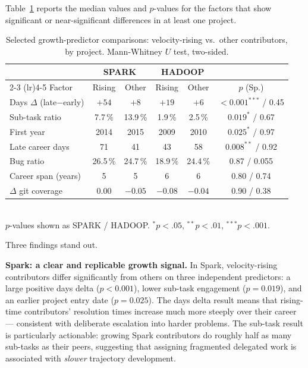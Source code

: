 \documentclass[12pt,a4paper]{article}
\begin{document}
Table~\ref{tab:growth_factors} reports the median values and
$p$-values for the factors that show significant or near-significant
differences in at least one project.

\begin{table}[h]
\centering
\caption{Selected growth-predictor comparisons:
velocity-rising vs.\ other contributors, by project.
Mann-Whitney $U$ test, two-sided.}
\label{tab:growth_factors}
\begin{tabular}{lccccc}
\toprule
 & \multicolumn{2}{c}{\textbf{SPARK}} & \multicolumn{2}{c}{\textbf{HADOOP}} \\
\cmidrule(lr){2-3} \cmidrule(lr){4-5}
Factor & Rising & Other & Rising & Other & $p$ (Sp.) \\
\midrule
Days $\Delta$ (late$-$early) & $+54$ & $+8$ & $+19$ & $+6$ & $<0.001^{***}$ / 0.45 \\
Sub-task ratio & 7.7\,\% & 13.9\,\% & 1.9\,\% & 2.5\,\% & $0.019^{*}$ / 0.67 \\
First year & 2014 & 2015 & 2009 & 2010 & $0.025^{*}$ / 0.97 \\
Late career days & 71 & 41 & 43 & 58 & $0.008^{**}$ / 0.92 \\
Bug ratio & 26.5\,\% & 24.7\,\% & 18.9\,\% & 24.4\,\% & 0.87 / 0.055 \\
Career span (years) & 5 & 5 & 6 & 6 & 0.80 / 0.74 \\
$\Delta$ git coverage & 0.00 & $-0.05$ & $-0.08$ & $-0.04$ & 0.90 / 0.38 \\
\bottomrule
\end{tabular}
\\[4pt]
\footnotesize $p$-values shown as SPARK / HADOOP. $^{*}p<.05$,
$^{**}p<.01$, $^{***}p<.001$.
\end{table}

Three findings stand out.

\textbf{Spark: a clear and replicable growth signal.}
In Spark, velocity-rising contributors differ significantly from others
on three independent predictors: a large positive days delta
($p < 0.001$), lower sub-task engagement ($p = 0.019$), and an
earlier project entry date ($p = 0.025$).
The days delta result means that rising-time contributors' resolution
times increase much more steeply over their career --- consistent with
deliberate escalation into harder problems.
The sub-task result is particularly actionable: growing Spark contributors
do roughly half as many sub-tasks as their peers, suggesting that
assigning fragmented delegated work is associated with \textit{slower}
trajectory development.
\end{document}
